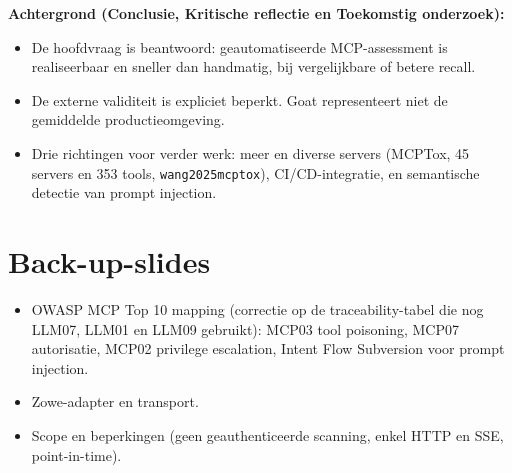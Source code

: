 \documentclass[11pt,a4paper]{article}
\newcommand{\code}[1]{\texttt{\small #1}}
\begin{document}
\textbf{Achtergrond (Conclusie, Kritische reflectie en Toekomstig onderzoek):}
\begin{itemize}
  \item De hoofdvraag is beantwoord: geautomatiseerde MCP-assessment is realiseerbaar en sneller dan handmatig, bij vergelijkbare of betere recall.
  \item De externe validiteit is expliciet beperkt. Goat representeert niet de gemiddelde productieomgeving.
  \item Drie richtingen voor verder werk: meer en diverse servers (MCPTox, 45 servers en 353 tools, \code{wang2025mcptox}), CI/CD-integratie, en semantische detectie van prompt injection.
\end{itemize}

\section{Back-up-slides}
\begin{itemize}
  \item OWASP MCP Top 10 mapping (correctie op de traceability-tabel die nog LLM07, LLM01 en LLM09 gebruikt): MCP03 tool poisoning, MCP07 autorisatie, MCP02 privilege escalation, Intent Flow Subversion voor prompt injection.
  \item Zowe-adapter en transport.
  \item Scope en beperkingen (geen geauthenticeerde scanning, enkel HTTP en SSE, point-in-time).
\end{itemize}
\end{document}
